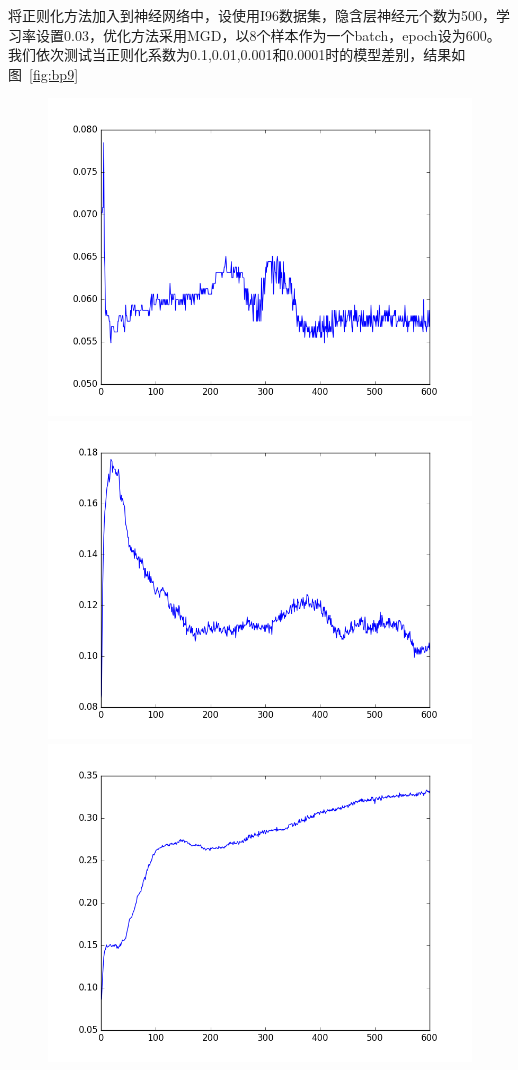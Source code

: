 将正则化方法加入到神经网络中，设使用I96数据集，隐含层神经元个数为500，学习率设置0.03，优化方法采用MGD，以8个样本作为一个batch，epoch设为600。我们依次测试当正则化系数为0.1,0.01,0.001和0.0001时的模型差别，结果如图~\ref{fig:bp9}
\begin{figure}[htb]
\centering
\includegraphics[scale=0.35]{../figures/Log/BP_new7/BP_new7_acc.png} 
\includegraphics[scale=0.35]{../figures/Log/BP_new9/BP_new9_acc.png} 
\includegraphics[scale=0.32]{../figures/Log/BP_new8/BP_new8_acc.png} 

\end{figure}
